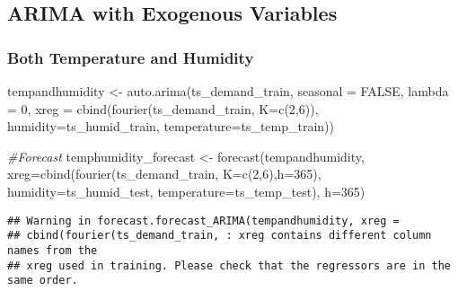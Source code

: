 \documentclass[
]{article}
\newenvironment{Shaded}{\begin{snugshade}}{\end{snugshade}}
\newcommand{\AttributeTok}[1]{\textcolor[rgb]{0.77,0.63,0.00}{#1}}
\newcommand{\CommentTok}[1]{\textcolor[rgb]{0.56,0.35,0.01}{\textit{#1}}}
\newcommand{\ConstantTok}[1]{\textcolor[rgb]{0.00,0.00,0.00}{#1}}
\newcommand{\DecValTok}[1]{\textcolor[rgb]{0.00,0.00,0.81}{#1}}
\newcommand{\FunctionTok}[1]{\textcolor[rgb]{0.00,0.00,0.00}{#1}}
\newcommand{\NormalTok}[1]{#1}
\newcommand{\OtherTok}[1]{\textcolor[rgb]{0.56,0.35,0.01}{#1}}
\begin{document}
\hypertarget{arima-with-exogenous-variables}{%
\subsection{ARIMA with Exogenous
Variables}\label{arima-with-exogenous-variables}}

\hypertarget{both-temperature-and-humidity}{%
\subsubsection{Both Temperature and
Humidity}\label{both-temperature-and-humidity}}

\begin{Shaded}
\begin{Highlighting}[]
\NormalTok{tempandhumidity }\OtherTok{\textless{}{-}} \FunctionTok{auto.arima}\NormalTok{(ts\_demand\_train,}
                  \AttributeTok{seasonal =} \ConstantTok{FALSE}\NormalTok{, }
                  \AttributeTok{lambda =} \DecValTok{0}\NormalTok{,}
         \AttributeTok{xreg =} \FunctionTok{cbind}\NormalTok{(}\FunctionTok{fourier}\NormalTok{(ts\_demand\_train, }
                                          \AttributeTok{K=}\FunctionTok{c}\NormalTok{(}\DecValTok{2}\NormalTok{,}\DecValTok{6}\NormalTok{)),}
               \AttributeTok{humidity=}\NormalTok{ts\_humid\_train,}
               \AttributeTok{temperature=}\NormalTok{ts\_temp\_train))}



\CommentTok{\#Forecast }
\NormalTok{temphumidity\_forecast }\OtherTok{\textless{}{-}} \FunctionTok{forecast}\NormalTok{(tempandhumidity,}
                           \AttributeTok{xreg=}\FunctionTok{cbind}\NormalTok{(}\FunctionTok{fourier}\NormalTok{(ts\_demand\_train, }
                                          \AttributeTok{K=}\FunctionTok{c}\NormalTok{(}\DecValTok{2}\NormalTok{,}\DecValTok{6}\NormalTok{),}\AttributeTok{h=}\DecValTok{365}\NormalTok{),}
                                \AttributeTok{humidity=}\NormalTok{ts\_humid\_test,}
                                \AttributeTok{temperature=}\NormalTok{ts\_temp\_test),}
                           \AttributeTok{h=}\DecValTok{365}\NormalTok{) }
\end{Highlighting}
\end{Shaded}

\begin{verbatim}
## Warning in forecast.forecast_ARIMA(tempandhumidity, xreg =
## cbind(fourier(ts_demand_train, : xreg contains different column names from the
## xreg used in training. Please check that the regressors are in the same order.
\end{verbatim}
\end{document}

